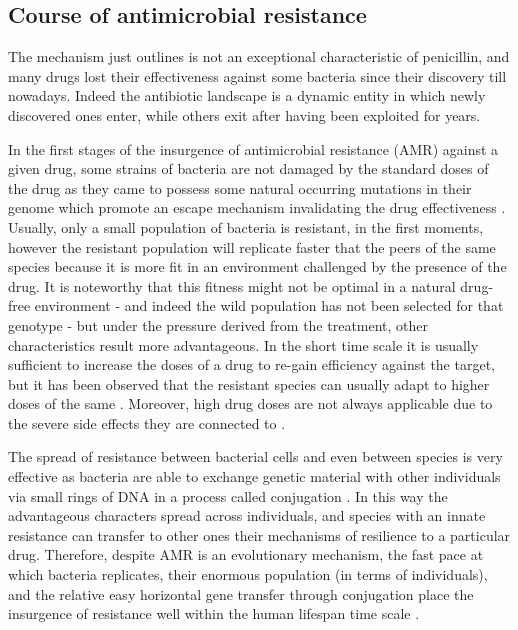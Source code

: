 \subsection{Course of antimicrobial resistance} \label{sec:course_AMR}
The mechanism just outlines is not an exceptional characteristic of penicillin, and many drugs lost their effectiveness against some bacteria since their discovery till nowadays. Indeed the antibiotic landscape is a dynamic entity in which newly discovered ones enter, while others exit after having been exploited for years.

In the first stages of the insurgence of antimicrobial resistance (AMR) against a given drug, some strains of bacteria are not damaged by the standard doses of the drug as they came to possess some natural occurring mutations in their genome which promote an escape mechanism invalidating the drug effectiveness \cite{Kapoor2017,Blair2014}. Usually, only a small population of bacteria is resistant,  in the first moments, however the resistant population will replicate faster that the peers of the same species because it is more fit in an environment challenged by the presence of the drug. It is noteworthy that this fitness might not be optimal in a natural drug-free environment - and indeed the wild population has not been selected for that genotype - but under the pressure derived from the treatment, other characteristics result more advantageous.
%
In the short time scale it is usually sufficient to increase the doses of a drug to re-gain efficiency against the target, but it has been observed that the resistant species can usually adapt to higher doses of the same \cite{????}. Moreover, high drug doses are not always applicable due to the severe side effects they are connected to \cite{????}.

The spread of resistance between bacterial cells and even between species is very effective as bacteria are able to exchange genetic material with other individuals via small rings of DNA in a process called conjugation \cite{????}. In this way the advantageous characters spread across individuals, and species with an innate resistance can transfer to other ones their mechanisms of resilience to a particular drug.
%
Therefore, despite AMR is an evolutionary mechanism, the fast pace at which bacteria replicates, their enormous population (in terms of individuals), and the relative easy horizontal gene transfer through conjugation place the insurgence of resistance well within the human lifespan time scale \cite{????}.

